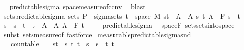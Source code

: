 \begin{isabellebody}
\isadelimproof
\ %
\endisadelimproof
%
\isatagproof
{}\isamarkupfalse%
\ predictable{\isacharunderscore}{\kern0pt}sigma\ space{\isacharunderscore}{\kern0pt}measure{\isacharunderscore}{\kern0pt}of{\isacharunderscore}{\kern0pt}conv\ \isamarkupfalse%
\ blast%
\endisatagproof
{\isafoldproof}%
%
\isadelimproof
%
\endisadelimproof
\isanewline
\isanewline
{}\isamarkupfalse%
\ sets{\isacharunderscore}{\kern0pt}predictable{\isacharunderscore}{\kern0pt}sigma{\isacharcolon}{\kern0pt}\ {\isachardoublequoteopen}sets\ {\isasymSigma}\isactrlsub P\ {\isacharequal}{\kern0pt}\ sigma{\isacharunderscore}{\kern0pt}sets\ {\isacharparenleft}{\kern0pt}{\isacharbraceleft}{\kern0pt}t\ {\isasymtimes}\ space\ M{\isacharparenright}{\kern0pt}\ {\isacharparenleft}{\kern0pt}{\isacharbraceleft}{\kern0pt}{\isacharbraceleft}{\kern0pt}s{\isacharless}{\kern0pt}{\isachardot}{\kern0pt}{\isachardot}{\kern0pt}t{\isacharbraceright}{\kern0pt}\ {\isasymtimes}\ A\ {\isacharbar}{\kern0pt}\ A\ s\ t{\isachardot}{\kern0pt}\ A\ {\isasymin}\ F\ s\ {\isasymand}\ t\ {\isasymle}\ s\ {\isasymand}\ s\ {\isacharless}{\kern0pt}\ t{\isacharbraceright}{\kern0pt}\ {\isasymunion}\ {\isacharbraceleft}{\kern0pt}{\isacharbraceleft}{\kern0pt}t\ {\isasymtimes}\ A\ {\isacharbar}{\kern0pt}\ A{\isachardot}{\kern0pt}\ A\ {\isasymin}\ F\ t\ \isanewline
%
\isadelimproof
\ \ %
\endisadelimproof
%
\isatagproof
{}\isamarkupfalse%
\ predictable{\isacharunderscore}{\kern0pt}sigma\ \isamarkupfalse%
\ space{\isacharunderscore}{\kern0pt}F\ sets{\isachardot}{\kern0pt}sets{\isacharunderscore}{\kern0pt}into{\isacharunderscore}{\kern0pt}space\ \isamarkupfalse%
\ {\isacharparenleft}{\kern0pt}subst\ sets{\isacharunderscore}{\kern0pt}measure{\isacharunderscore}{\kern0pt}of{\isacharparenright}{\kern0pt}\ fastforce{\isacharplus}{\kern0pt}%
\endisatagproof
{\isafoldproof}%
%
\isadelimproof
\isanewline
%
\endisadelimproof
\isanewline
{}\isamarkupfalse%
\ measurable{\isacharunderscore}{\kern0pt}predictable{\isacharunderscore}{\kern0pt}sigma{\isacharunderscore}{\kern0pt}snd{\isacharcolon}{\kern0pt}\isanewline
\ \ \ {\isachardoublequoteopen}countable\ {\isasymI}{\isachardoublequoteclose}\ {\isachardoublequoteopen}{\isasymI}\ {\isasymsubseteq}\ {\isacharbraceleft}{\kern0pt}{\isacharbraceleft}{\kern0pt}s{\isacharless}{\kern0pt}{\isachardot}{\kern0pt}{\isachardot}{\kern0pt}t{\isacharbraceright}{\kern0pt}\ {\isacharbar}{\kern0pt}\ s\ t{\isachardot}{\kern0pt}\ t\ {\isasymle}\ s\ {\isasymand}\ s\ {\isacharless}{\kern0pt}\ t{\isacharbraceright}{\kern0pt}{\isachardoublequoteclose}\ {\isachardoublequoteopen}{\isacharbraceleft}{\kern0pt}t\ {\isasymsubseteq}\ {\isacharparenleft}{\kern0pt}{\isasymUnion}{\isasymI}{\isacharparenright}{\kern0pt}{\isachardoublequoteclose}\isanewline

\end{isabellebody}
